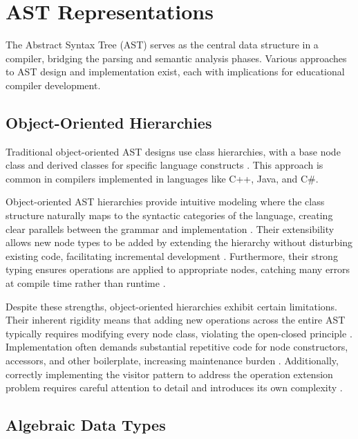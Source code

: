 \pagebreak


\section{AST Representations}

The Abstract Syntax Tree (AST) serves as the central data structure in a compiler, bridging the parsing and semantic analysis phases. Various approaches to AST design and implementation exist, each with implications for educational compiler development.

\subsection{Object-Oriented Hierarchies}

Traditional object-oriented AST designs use class hierarchies, with a base node class and derived classes for specific language constructs \cite{gamma1995design}. This approach is common in compilers implemented in languages like C++, Java, and C\#.

Object-oriented AST hierarchies provide intuitive modeling where the class structure naturally maps to the syntactic categories of the language, creating clear parallels between the grammar and implementation \cite{appel2004modern}. Their extensibility allows new node types to be added by extending the hierarchy without disturbing existing code, facilitating incremental development \cite{gamma1995design}. Furthermore, their strong typing ensures operations are applied to appropriate nodes, catching many errors at compile time rather than runtime \cite{odersky2004overview}.

Despite these strengths, object-oriented hierarchies exhibit certain limitations. Their inherent rigidity means that adding new operations across the entire AST typically requires modifying every node class, violating the open-closed principle \cite{gamma1995design}. Implementation often demands substantial repetitive code for node constructors, accessors, and other boilerplate, increasing maintenance burden \cite{appel2004modern}. Additionally, correctly implementing the visitor pattern to address the operation extension problem requires careful attention to detail and introduces its own complexity \cite{gamma1995design}.


\subsection{Algebraic Data Types}

